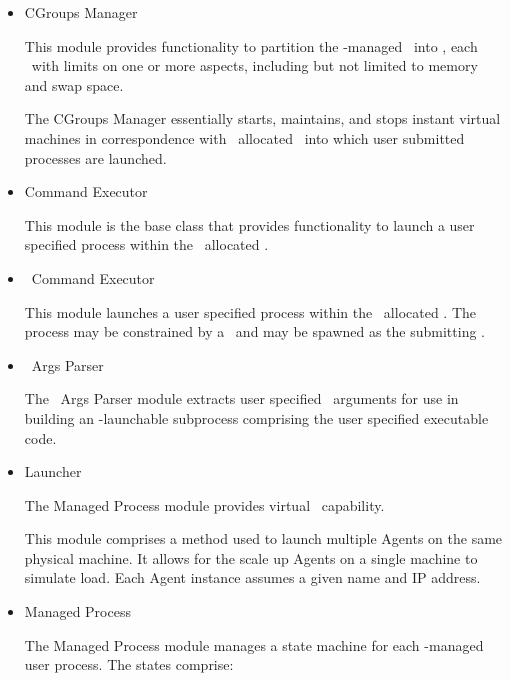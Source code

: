     \begin{itemize}
      \item CGroups Manager
      
      This module provides functionality to partition the \varAgent-managed
      \varNodeMachineComputer~into \varShares, each \varShare~with limits on one
      or more aspects, including but not limited to memory and swap space. 
      
      The CGroups Manager essentially starts, maintains, and stops instant
      virtual machines in correspondence with \varResourceManager~allocated
      \varShares~into which user submitted processes are launched.
      
      \item Command Executor
      
      This module is the base class that provides functionality to
      launch a user specified process within the 
      \varResourceManager~allocated \varShare. 
      
      \item \varDUCC~Command Executor
      
      This module launches a user specified process within the 
      \varResourceManager~allocated \varShare. 
      The process may be constrained by a \varLinuxControlGroup~and
      may be spawned as the submitting \varUser.
      
      \item \varJVM~Args Parser
      
      The \varJVM~Args Parser module extracts user specified \varJVM~arguments
      for use in building an \varAgent-launchable subprocess comprising
      the user specified executable code.
      
      \item Launcher
      
      The Managed Process module provides virtual \varAgent~capability.
      
      This module comprises a method used to launch multiple Agents
      on the same physical machine. 
      It allows for the scale up Agents on a single machine to simulate load.
      Each Agent instance assumes a given name and IP address.
      
      \item Managed Process

      The Managed Process module manages a state machine for each
      \varAgent-managed user process.  The states comprise:
      

\end{itemize}
